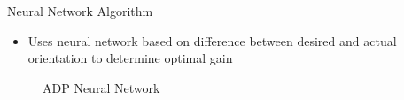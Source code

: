 \documentclass[final]{beamer}
\newlength{\onecolwid}
\begin{document}
\begin{frame}[t]
\begin{columns}[t]
\begin{column}{\onecolwid}
\begin{block}{Neural Network Algorithm}
\vskip -1cm
\begin{itemize}
    \item Uses neural network based on difference between desired and actual orientation to determine optimal gain
\end{itemize} 

\begin{figure}
    \centering
    \caption{ADP Neural Network}
    \label{fig:NeuralNetwork}
\end{figure}




\end{block}
\end{column}
\end{columns}
\end{frame}
\end{document}
